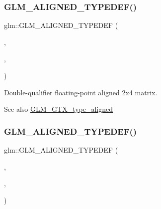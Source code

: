 \subsubsection{\texorpdfstring{G\+L\+M\+\_\+\+A\+L\+I\+G\+N\+E\+D\+\_\+\+T\+Y\+P\+E\+D\+E\+F()}{GLM\_ALIGNED\_TYPEDEF()}\hspace{0.1cm}{\footnotesize\ttfamily [198/209]}}
{\footnotesize\ttfamily glm\+::\+G\+L\+M\+\_\+\+A\+L\+I\+G\+N\+E\+D\+\_\+\+T\+Y\+P\+E\+D\+EF (\begin{DoxyParamCaption}\item[{\mbox{\hyperlink{group__gtc__type__precision_gae075a2083e1801ada5c99c91f79eb6ed}{f64mat2x4}}}]{,  }\item[{aligned\+\_\+f64mat2x4}]{,  }\item[{32}]{ }\end{DoxyParamCaption})}

Double-\/qualifier floating-\/point aligned 2x4 matrix. \begin{DoxySeeAlso}{See also}
\mbox{\hyperlink{group__gtx__type__aligned}{G\+L\+M\+\_\+\+G\+T\+X\+\_\+type\+\_\+aligned}} 
\end{DoxySeeAlso}
\mbox{\label{group__gtx__type__aligned_ga9ddf5212777734d2fd841a84439f3bdf}} 
\subsubsection{\texorpdfstring{G\+L\+M\+\_\+\+A\+L\+I\+G\+N\+E\+D\+\_\+\+T\+Y\+P\+E\+D\+E\+F()}{GLM\_ALIGNED\_TYPEDEF()}\hspace{0.1cm}{\footnotesize\ttfamily [199/209]}}
{\footnotesize\ttfamily glm\+::\+G\+L\+M\+\_\+\+A\+L\+I\+G\+N\+E\+D\+\_\+\+T\+Y\+P\+E\+D\+EF (\begin{DoxyParamCaption}\item[{\mbox{\hyperlink{group__gtc__type__precision_ga311a3bf48bfe2c95150e9f71db9063c5}{f64mat3x2}}}]{,  }\item[{aligned\+\_\+f64mat3x2}]{,  }\item[{32}]{ }\end{DoxyParamCaption})}

